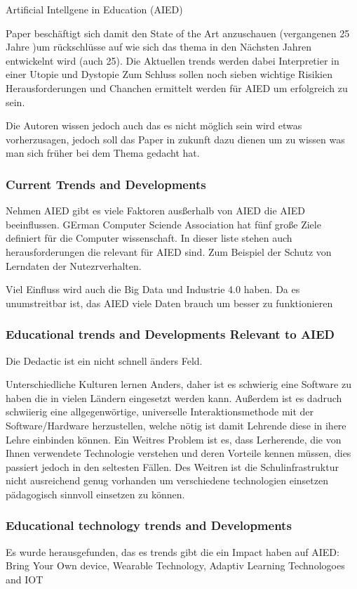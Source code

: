 Artificial Intellgene in Education (AIED)

Paper beschäftigt sich damit den State of the Art anzuschauen (vergangenen 25 Jahre )um rückschlüsse auf wie sich das
thema in den Nächsten Jahren entwickelnt wird (auch 25). Die Aktuellen trends werden dabei Interpretier in einer Utopie und Dystopie
Zum Schluss sollen noch sieben wichtige Risikien Herausforderungen und Chanchen ermittelt werden für AIED um erfolgreich zu sein.

Die Autoren wissen jedoch auch das es nicht möglich sein wird etwas vorherzusagen, jedoch soll das Paper in zukunft dazu dienen um zu wissen was man sich früher bei dem Thema gedacht hat.


\subsubsection*{Current Trends and Developments}

Nehmen AIED gibt es viele Faktoren ausßerhalb von AIED die AIED beeinflussen.
GErman Computer Sciende Association hat fünf große Ziele definiert für die Computer wissenschaft. In dieser
liste stehen auch herausforderungen die relevant für AIED sind. Zum Beispiel der Schutz von Lerndaten der Nutezrverhalten.

Viel Einfluss wird auch die Big Data und Industrie 4.0 haben. Da es unumstreitbar ist, das AIED viele Daten brauch um besser zu funktionieren

\subsubsection{Educational trends and Developments Relevant to AIED}
Die Dedactic ist ein nicht schnell änders Feld.

Unterschiedliche Kulturen lernen Anders, daher ist es schwierig eine Software zu haben die in vielen Ländern eingesetzt werden kann.
Außerdem ist es dadruch schwiierig eine allgegenwörtige, universelle Interaktionsmethode mit der Software/Hardware herzustellen,
welche nötig ist damit Lehrende diese in ihere Lehre einbinden können. 
Ein Weitres Problem ist es, dass Lerherende, die von Ihnen verwendete Technologie verstehen und deren Vorteile kennen müssen,
dies passiert jedoch in den seltesten Fällen. Des Weitren ist die Schulinfrastruktur nicht ausreichend genug vorhanden um verschiedene technologien einsetzen pädagogisch sinnvoll einsetzen zu können.


\subsubsection{Educational technology trends and Developments}
Es wurde herausgefunden, das es trends gibt die ein Impact haben auf AIED: Bring Your Own device, Wearable Technology, Adaptiv Learning Technologoes and IOT

